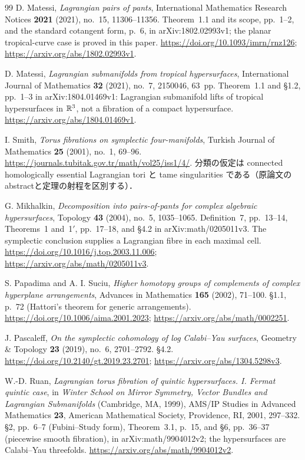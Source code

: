 \begin{thebibliography}{99}
D. Matessi,
\emph{Lagrangian pairs of pants},
International Mathematics Research Notices \textbf{2021} (2021), no.~15, 11306--11356.
Theorem~1.1 and its scope, pp.~1--2, and the standard cotangent form, p.~6,
in arXiv:1802.02993v1; the planar tropical-curve case is proved in this paper.
\url{https://doi.org/10.1093/imrn/rnz126};
\url{https://arxiv.org/abs/1802.02993v1}.

D. Matessi,
\emph{Lagrangian submanifolds from tropical hypersurfaces},
International Journal of Mathematics \textbf{32} (2021), no.~7, 2150046, 63~pp.
Theorem~1.1 and \S1.2, pp.~1--3 in arXiv:1804.01469v1:
Lagrangian submanifold lifts of tropical hypersurfaces in $\mathbb R^3$,
not a fibration of a compact hypersurface.
\url{https://arxiv.org/abs/1804.01469v1}.

I. Smith,
\emph{Torus fibrations on symplectic four-manifolds},
Turkish Journal of Mathematics \textbf{25} (2001), no.~1, 69--96.
\url{https://journals.tubitak.gov.tr/math/vol25/iss1/4/}.
分類の仮定は connected homologically essential Lagrangian tori と
tame singularities である（原論文のabstractと定理の射程を区別する）．

G. Mikhalkin,
\emph{Decomposition into pairs-of-pants for complex algebraic hypersurfaces},
Topology \textbf{43} (2004), no.~5, 1035--1065.
Definition~7, pp.~13--14, Theorems~1 and~1$'$, pp.~17--18,
and \S4.2 in arXiv:math/0205011v3.
The symplectic conclusion supplies a Lagrangian fibre in each maximal cell.
\url{https://doi.org/10.1016/j.top.2003.11.006};
\url{https://arxiv.org/abs/math/0205011v3}.

S. Papadima and A. I. Suciu,
\emph{Higher homotopy groups of complements of complex hyperplane arrangements},
Advances in Mathematics \textbf{165} (2002), 71--100.
\S1.1, p.~72 (Hattori's theorem for generic arrangements).
\url{https://doi.org/10.1006/aima.2001.2023};
\url{https://arxiv.org/abs/math/0002251}.

J. Pascaleff,
\emph{On the symplectic cohomology of log Calabi--Yau surfaces},
Geometry \& Topology \textbf{23} (2019), no.~6, 2701--2792.
\S4.2.
\url{https://doi.org/10.2140/gt.2019.23.2701};
\url{https://arxiv.org/abs/1304.5298v3}.

W.-D. Ruan,
\emph{Lagrangian torus fibration of quintic hypersurfaces. I. Fermat quintic case},
in \emph{Winter School on Mirror Symmetry, Vector Bundles and Lagrangian Submanifolds}
(Cambridge, MA, 1999), AMS/IP Studies in Advanced Mathematics \textbf{23},
American Mathematical Society, Providence, RI, 2001, 297--332.
\S2, pp.~6--7 (Fubini--Study form), Theorem~3.1, p.~15,
and \S6, pp.~36--37 (piecewise smooth fibration),
in arXiv:math/9904012v2; the hypersurfaces are Calabi--Yau threefolds.
\url{https://arxiv.org/abs/math/9904012v2}.


\end{thebibliography}
